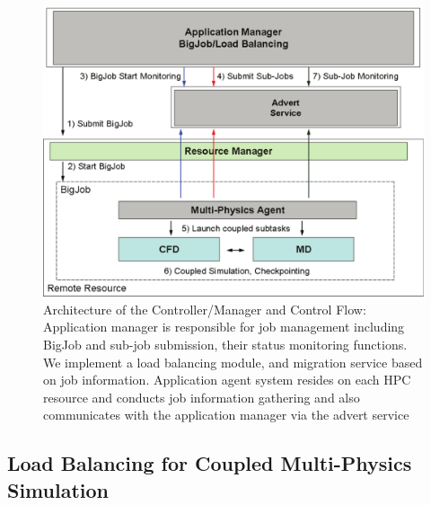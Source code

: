 \documentclass[conference,final]{IEEEtran}
\begin{document}
\begin{figure}
\centering
\includegraphics[scale=0.38]{Structure_of_BigJob}
\caption{\small Architecture of the Controller/Manager and Control Flow: Application manager is responsible for job management including BigJob and sub-job submission, their status monitoring functions. We implement a load balancing module, and migration service based on job information. Application agent system resides on each HPC resource and conducts job information gathering and also communicates with the application manager via the advert service}
\label{Fig:BigJob_Structure}
\vspace{-1em}
\end{figure}


\subsection{Load Balancing for Coupled Multi-Physics Simulation}
\end{document}
